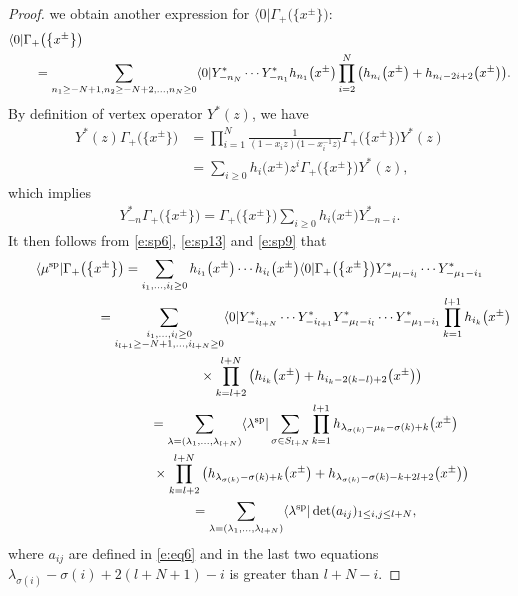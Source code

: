 \documentclass[10pt,a4paper]{amsart}
\numberwithin{equation}{section}
\begin{document}
\begin{proof}
we obtain another expression for $\langle 0|\Gamma_+\big(\big\{x^{\pm}\big\}\big)$:
\begin{align}\label{e:sp13}
&\langle 0|\Gamma_+\big(\big\{x^{\pm}\big\}\big)\\
&\qquad=\sum_{n_1\geq -N+1,n_2\geq -N+2,\dots,n_N\geq 0}
\langle 0|Y^*_{-n_N}\cdots Y^*_{-n_1}h_{n_1}\big(x^{\pm}\big)\prod^N_{i=2}\big(h_{n_i}\big(x^{\pm}\big)+h_{n_i-2i+2}\big(x^{\pm}\big)\big).\notag
\end{align}
By definition of vertex operator $Y^*(z)$, we have
\begin{align*}%
 {}Y^*(z)\Gamma_+\big(\big\{x^{\pm}\big\}\big)& =\prod^N_{i=1}\frac{1}{(1-x_iz)\big(1-x^{-1}_iz\big)}\Gamma_+\big(\big\{x^{\pm}\big\}\big)Y^*(z)\\
& =\sum_{i\geq 0}h_i\big(x^{\pm}\big)z^i\Gamma_+\big(\big\{x^{\pm}\big\}\big)Y^*(z),
\end{align*}
which implies
\begin{align*}
Y^*_{-n}\Gamma_+\big(\big\{x^{\pm}\big\}\big) = \Gamma_+\big(\big\{x^{\pm}\big\}\big)\sum_{i\geq 0}h_i\big(x^{\pm}\big)Y^*_{-n-i}.
\end{align*}
It then follows from \eqref{e:sp6}, \eqref{e:sp13} and \eqref{e:sp9} that
\begin{gather}
\notag \langle\mu^{\rm sp}|\Gamma_+\big(\big\{x^{\pm}\big\}\big)=\sum_{i_1,\dots,i_l\geq 0}h_{i_1}\big(x^{\pm}\big)\cdots h_{i_l}\big(x^{\pm}\big)\langle 0|\Gamma_+\big(\big\{x^{\pm}\big\}\big)Y^*_{-\mu_l-i_l}\cdots Y^*_{-\mu_1-i_1}
\\ \notag \hphantom{\langle\mu^{\rm sp}|\Gamma_+\big(\big\{x^{\pm}\big\}\big)}{}
=\sum_{\substack{i_1,\dots,i_l\geq 0\\i_{l+1}\geq -N+1,\dots,i_{l+N}\geq 0}}\langle 0|Y^*_{-i_{l+N}}\cdots Y^*_{-i_{l+1}}Y^*_{-\mu_l-i_l}\cdots Y^*_{-\mu_1-i_1}\prod^{l+1}_{k=1}h_{i_k}\big(x^{\pm}\big)
\\ \notag \hphantom{\langle\mu^{\rm sp}|\Gamma_+\big(\big\{x^{\pm}\big\}\big)=}{}
 \times\prod^{l+N}_{k=l+2}\big(h_{i_k}\big(x^{\pm}\big)+h_{i_k-2(k-l)+2}\big(x^{\pm}\big)\big)
\\ \notag \hphantom{\langle\mu^{\rm sp}|\Gamma_+\big(\big\{x^{\pm}\big\}\big)}{}
=\sum_{\lambda=(\lambda_1,\dots,\lambda_{l+N})}\langle\lambda^{\rm sp}|\sum_{\sigma\in S_{l+N}}
\prod^{l+1}_{k=1}h_{\lambda_{\sigma(k)}-\mu_k-\sigma(k)+k}\big(x^{\pm}\big)
\\ \notag \hphantom{\langle\mu^{\rm sp}|\Gamma_+\big(\big\{x^{\pm}\big\}\big)=}{}
 \times\prod^{l+N}_{k=l+2}\big(h_{\lambda_{\sigma(k)}-\sigma(k)+k}\big(x^{\pm}\big)+h_{\lambda_{\sigma(k)}-\sigma(k)-k+2l+2}\big(x^{\pm}\big)\big)
\\ \hphantom{\langle\mu^{\rm sp}|\Gamma_+\big(\big\{x^{\pm}\big\}\big)}{}
=\sum_{\lambda=(\lambda_1,\dots,\lambda_{l+N})}\langle\lambda^{\rm sp}|\det(a_{ij})_{1\leq i,j\leq l+N},\label{e:sp14}
\end{gather}
where $a_{ij}$ are defined in \eqref{e:eq6} and in the last two equations $\lambda_{\sigma(i)}-\sigma(i)+2(l+N+1)-i$ is greater than $l+N-i$.
\end{proof}
\end{document}
